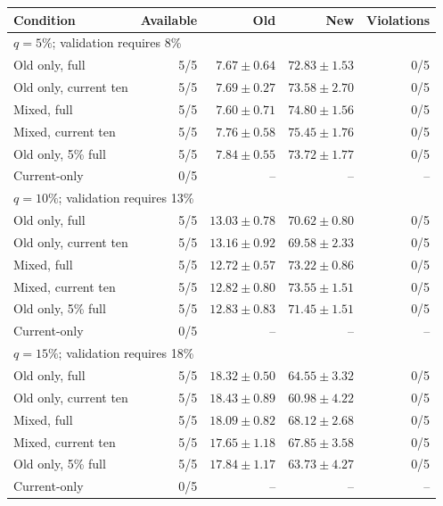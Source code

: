 \begin{tabular}{lrrrr}
\toprule
Condition & Available & Old & New & Violations\\
\midrule
\multicolumn{5}{l}{$q=5\%$; validation requires 8\%}\\
Old only, full & 5/5 & $7.67\pm0.64$ & $72.83\pm1.53$ & 0/5\\
Old only, current ten & 5/5 & $7.69\pm0.27$ & $73.58\pm2.70$ & 0/5\\
Mixed, full & 5/5 & $7.60\pm0.71$ & $74.80\pm1.56$ & 0/5\\
Mixed, current ten & 5/5 & $7.76\pm0.58$ & $75.45\pm1.76$ & 0/5\\
Old only, 5\% full & 5/5 & $7.84\pm0.55$ & $73.72\pm1.77$ & 0/5\\
Current-only & 0/5 & -- & -- & --\\
\multicolumn{5}{l}{$q=10\%$; validation requires 13\%}\\
Old only, full & 5/5 & $13.03\pm0.78$ & $70.62\pm0.80$ & 0/5\\
Old only, current ten & 5/5 & $13.16\pm0.92$ & $69.58\pm2.33$ & 0/5\\
Mixed, full & 5/5 & $12.72\pm0.57$ & $73.22\pm0.86$ & 0/5\\
Mixed, current ten & 5/5 & $12.82\pm0.80$ & $73.55\pm1.51$ & 0/5\\
Old only, 5\% full & 5/5 & $12.83\pm0.83$ & $71.45\pm1.51$ & 0/5\\
Current-only & 0/5 & -- & -- & --\\
\multicolumn{5}{l}{$q=15\%$; validation requires 18\%}\\
Old only, full & 5/5 & $18.32\pm0.50$ & $64.55\pm3.32$ & 0/5\\
Old only, current ten & 5/5 & $18.43\pm0.89$ & $60.98\pm4.22$ & 0/5\\
Mixed, full & 5/5 & $18.09\pm0.82$ & $68.12\pm2.68$ & 0/5\\
Mixed, current ten & 5/5 & $17.65\pm1.18$ & $67.85\pm3.58$ & 0/5\\
Old only, 5\% full & 5/5 & $17.84\pm1.17$ & $63.73\pm4.27$ & 0/5\\
Current-only & 0/5 & -- & -- & --\\
\bottomrule
\end{tabular}
